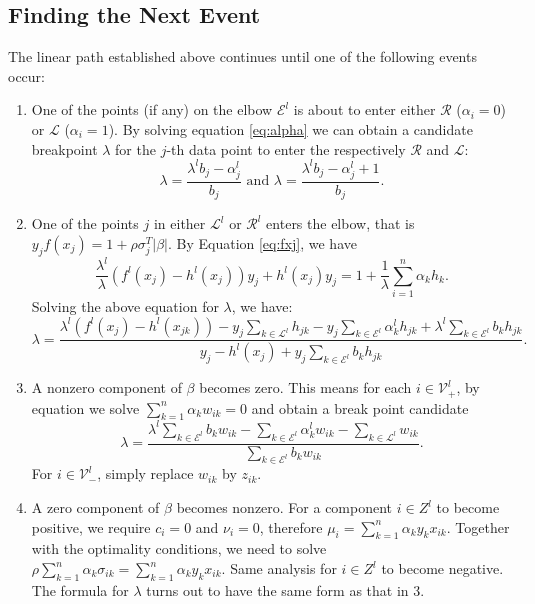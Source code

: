 \documentclass[10pt]{article}
\theoremstyle{definition}
\begin{document}
\subsection{Finding the Next Event}
The linear path established above continues until one of the following events occur:
\begin{enumerate}
\item One of the points (if any) on the elbow $\mathcal E^l$ is about to enter either $\mathcal R$ ($\alpha_i=0$) or $\mathcal L$ ($\alpha_i=1$). By solving equation \eqref{eq:alpha} we can obtain a candidate breakpoint $\lambda$ for the $j$-th data point to enter the respectively $\mathcal R$ and $\mathcal L$:
\[
\lambda = \frac{\lambda^lb_j-\alpha_j^l}{b_j} \text{ and } \lambda = \frac{\lambda^lb_j-\alpha_j^l+1}{b_j}.
\]
\item One of the points $j$ in either $\mathcal L^l$ or $\mathcal R^l$ enters the elbow, that is $y_jf(x_j) = 1+\rho\sigma_j^T|\beta|$. By Equation \eqref{eq:fxj}, we have
\[
\frac{\lambda^l}{\lambda}(f^l(x_j)-h^l(x_j))y_j + h^l(x_j)y_j = 1 + \frac{1}{\lambda}\sum_{i=1}^n\alpha_kh_k.
\]   
Solving the above equation for $\lambda$, we have:
\[
\lambda = \frac{\lambda^l(f^l(x_j)-h^l(x_{jk}))-y_j\sum_{k\in\mathcal L^l}h_{jk} - y_j\sum_{k\in\mathcal E^l}\alpha_k^lh_{jk} + \lambda^l\sum_{k\in\mathcal E^l}b_k h_{jk}}{y_j-h^l(x_j)+y_j\sum_{k\in\mathcal E^l}b_kh_{jk}}.
\]
\item A nonzero component of $\beta$ becomes zero. This means for each $i\in\mathcal V_+^l$, by equation  we solve $\sum_{k=1}^n\alpha_kw_{ik}=0$ and obtain a break point candidate
\[
\lambda = \frac{\lambda^l\sum_{k\in\mathcal E^l} b_kw_{ik}-\sum_{k\in\mathcal E^l}\alpha_k^l w_{ik}-\sum_{k\in\mathcal L^l} w_{ik}}{\sum_{k\in\mathcal E^l} b_kw_{ik}}.
\]
For $i\in\mathcal V_-^l$, simply replace $w_{ik}$ by $z_{ik}$.

\item A zero component of $\beta$ becomes nonzero. For a component $i\in Z^l$ to become positive, we require $c_i = 0$ and $\nu_i =0$, therefore $\mu_i = \sum_{k=1}^n\alpha_ky_kx_{ik}$. Together with the optimality conditions, we need to solve $\rho\sum_{k=1}^n\alpha_k\sigma_{ik}=\sum_{k=1}^n\alpha_ky_kx_{ik}$. Same analysis for $i\in Z^l$ to become negative. The formula for $\lambda$ turns out to have the same form as that in 3.



\end{enumerate}
  
\end{document}
